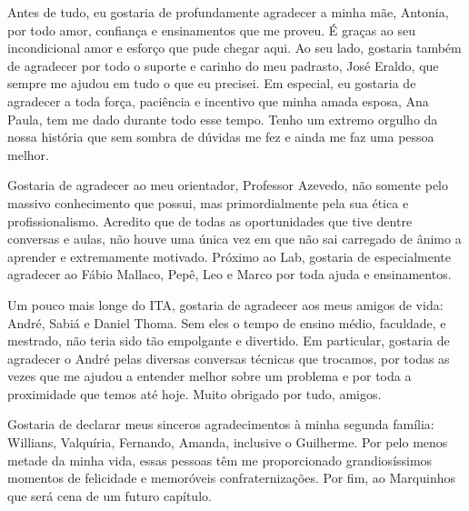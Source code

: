 Antes de tudo, eu gostaria de profundamente agradecer a minha mãe, Antonia, por todo amor, confiança e ensinamentos que me proveu. É graças ao seu incondicional amor e esforço que pude chegar aqui. Ao seu lado, gostaria também de agradecer por todo o suporte e carinho do meu padrasto, José Eraldo, que sempre me ajudou em tudo o que eu precisei. Em especial, eu gostaria de agradecer a toda força, paciência e incentivo que minha amada esposa, Ana Paula, tem me dado durante todo esse tempo. Tenho um extremo orgulho da nossa história que sem sombra de dúvidas me fez e ainda me faz uma pessoa melhor. 

Gostaria de agradecer ao meu orientador, Professor Azevedo, não somente pelo massivo conhecimento que possui, mas primordialmente pela sua ética e profissionalismo. Acredito que de todas as oportunidades que tive dentre conversas e aulas, não houve uma única vez em que não sai carregado de ânimo a aprender e extremamente motivado. Próximo ao Lab, gostaria de especialmente agradecer ao Fábio Mallaco, Pepê, Leo e Marco por toda ajuda e ensinamentos. 

Um pouco mais longe do ITA, gostaria de agradecer aos meus amigos de vida: André, Sabiá e Daniel Thoma. Sem eles o tempo de ensino médio, faculdade, e mestrado, não teria sido tão empolgante e divertido. Em particular, gostaria de agradecer o André pelas diversas conversas técnicas que trocamos, por todas as vezes que me ajudou a entender melhor sobre um problema e por toda a proximidade que temos até hoje. Muito obrigado por tudo, amigos.

Gostaria de declarar meus sinceros agradecimentos à minha segunda família: Willians, Valquíria, Fernando, Amanda, inclusive o Guilherme. Por pelo menos metade da minha vida, essas pessoas têm me proporcionado grandiosíssimos momentos de felicidade e memoróveis confraternizações. Por fim, ao Marquinhos que será cena de um futuro capítulo.